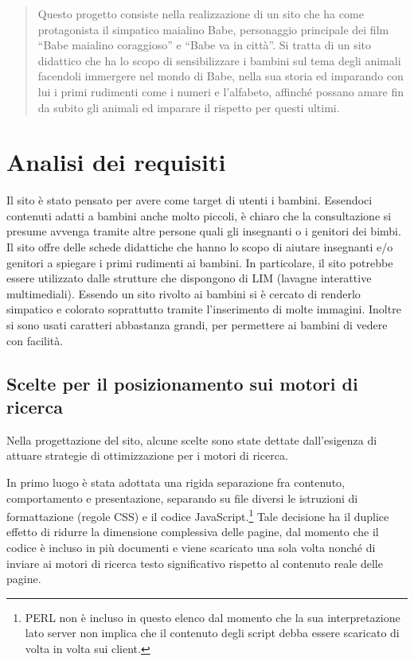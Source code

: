 \documentclass[10pt,a4paper,onecolumn]{article}
\begin{document}
\clearpage

\tableofcontents

\clearpage 

\begin{abstract}
Questo progetto consiste nella realizzazione di un sito che ha come protagonista il simpatico maialino Babe, personaggio principale dei film ``Babe maialino coraggioso'' e ``Babe va in città''.
Si tratta di un sito didattico che ha lo scopo di sensibilizzare i bambini sul tema degli animali facendoli immergere nel mondo di Babe, nella sua storia ed imparando con lui i primi rudimenti come i numeri e l'alfabeto, affinché possano amare fin da subito gli animali ed imparare il rispetto per questi ultimi.
\end{abstract}

\clearpage

\section{Analisi dei requisiti}
Il sito è stato pensato per avere come target di utenti i bambini. Essendoci contenuti adatti a bambini anche molto piccoli, è chiaro che la consultazione si presume avvenga tramite altre persone quali gli insegnanti o i genitori dei bimbi. 
Il sito offre delle schede didattiche che hanno lo scopo di aiutare insegnanti e/o genitori a spiegare i primi rudimenti ai bambini.
In particolare, il sito potrebbe essere utilizzato dalle strutture che dispongono di LIM (lavagne interattive multimediali).
Essendo un sito rivolto ai bambini si è cercato di renderlo simpatico e colorato soprattutto tramite l'inserimento di molte immagini. Inoltre si sono usati caratteri abbastanza grandi, per permettere ai bambini di vedere con facilità.


\subsection{Scelte per il posizionamento sui motori di ricerca}
Nella progettazione del sito, alcune scelte sono state dettate dall'esigenza di attuare strategie di ottimizzazione per i motori di ricerca.

In primo luogo è stata adottata una rigida separazione fra contenuto, comportamento e presentazione, separando su file diversi le istruzioni di formattazione (regole CSS) e il codice JavaScript.\footnote{%
  PERL non è incluso in questo elenco dal momento che la sua interpretazione lato server non implica che il contenuto degli script debba essere scaricato di volta in volta sui client.
} Tale decisione ha il duplice effetto di ridurre la dimensione complessiva delle pagine, dal momento che il codice è incluso in più documenti e viene scaricato una sola volta nonché di inviare ai motori di ricerca testo significativo rispetto al contenuto reale delle pagine.
\end{document}
